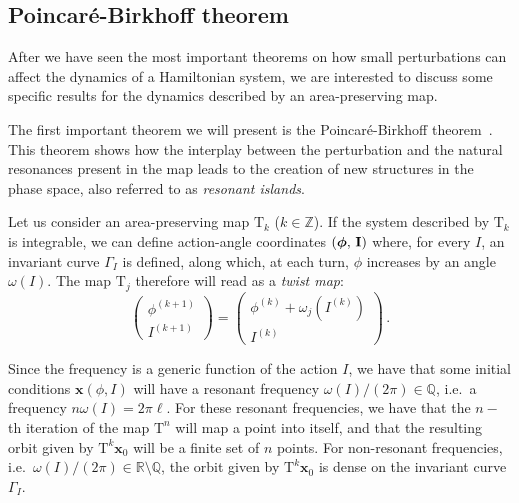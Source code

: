 \subsection{Poincaré-Birkhoff theorem}\label{subsec:poincare-birkhoff}

After we have seen the most important theorems on how small perturbations can affect the dynamics of a Hamiltonian system, we are interested to discuss some specific results for the dynamics described by an area-preserving map.

The first important theorem we will present is the Poincaré-Birkhoff theorem~\cite{poincare, birkhoff}. This theorem shows how the interplay between the perturbation and the natural resonances present in the map leads to the creation of new structures in the phase space, also referred to as \textit{resonant islands}.

Let us consider an area-preserving map $\mathrm{T}_k$ ($k\in\mathbb{Z}$). If the system described by $\mathrm{T}_k$ is integrable, we can define action-angle coordinates $(\boldsymbol{\phi},\,\vb{I})$ where, for every $I$, an invariant curve $\Gamma_{I}$ is defined, along which, at each turn, $\phi$ increases by an angle $\omega(I)$. The map $\mathrm{T}_j$ therefore will read as a \textit{twist map}:
%
\begingroup
\renewcommand*{\arraystretch}{1.5}
\begin{equation}
	\begin{pmatrix} {\phi}^{(k+1)} \\ {I}^{(k+1)} \end{pmatrix}  = \begin{pmatrix} {\phi}^{(k)} + {\omega}_j\left({I}^{(k)}\right) \\ {I}^{(k)} \end{pmatrix} \, .
\end{equation}
\endgroup

Since the frequency  is a generic function of the action $I$, we have that some initial conditions $\mathbf{x}(\phi,I)$ will have a resonant frequency ${\omega}({I})/(2\pi)\in \mathbb{Q}$, i.e.\ a frequency $n\omega(I)=2\pi \ell$. For these resonant frequencies, we have that the $n-$th iteration of the map $\mathrm{T}^n$ will map a point into itself, and that the resulting orbit given by $\mathrm{T}^k \mathbf{x}_0$ will be a finite set of $n$ points. For non-resonant frequencies, i.e.\ $\omega(I)/(2\pi) \in \mathbb{R}\setminus \mathbb{Q}$, the orbit given by $\mathrm{T}^k \mathbf{x}_0$ is dense on the invariant curve $\Gamma_{I}$.

